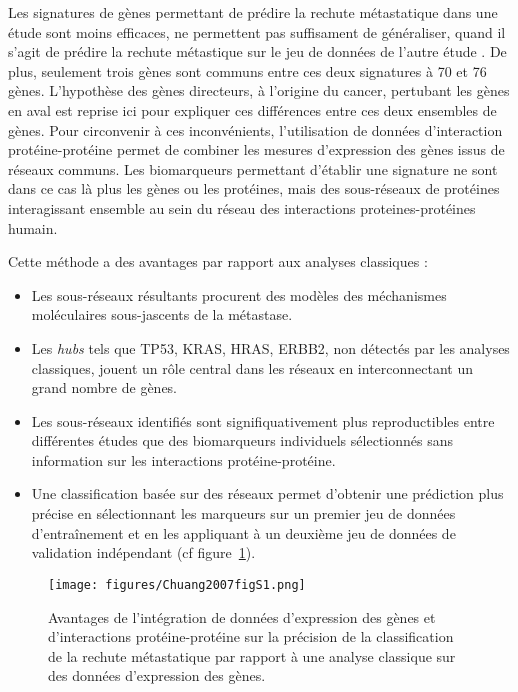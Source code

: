 			Les signatures de gènes permettant de prédire la rechute métastatique dans une étude sont moins efficaces, ne permettent pas suffisament de généraliser, quand il s'agit de prédire la rechute métastique sur le jeu de données de l'autre étude \citep{EinDor2006}.
			De plus, seulement trois gènes sont communs entre ces deux signatures à 70 et 76 gènes.
			L'hypothèse des gènes directeurs, à l'origine du cancer, pertubant les gènes en aval est reprise ici pour expliquer ces différences entre ces deux ensembles de gènes.
			Pour circonvenir à ces inconvénients, l'utilisation de données d'interaction protéine-protéine permet de combiner les mesures d'expression des gènes issus de réseaux communs.
			Les biomarqueurs permettant d'établir une signature ne sont dans ce cas là plus les gènes ou les protéines, mais des sous-réseaux de protéines interagissant ensemble au sein du réseau des interactions proteines-protéines humain.

			Cette méthode a des avantages par rapport aux analyses classiques :
			\begin{itemize}
				\item Les sous-réseaux résultants procurent des modèles des méchanismes moléculaires sous-jascents de la métastase.
				\item Les \emph{hubs} tels que \acs{TP53}, \acs{KRAS}, \acs{HRAS}, \acs{ERBB2}, non détectés par les analyses classiques, jouent un rôle central dans les réseaux en interconnectant un grand nombre de gènes.
				\item Les sous-réseaux identifiés sont signifiquativement plus reproductibles entre différentes études que des biomarqueurs individuels sélectionnés sans information sur les interactions protéine-protéine.
				\item Une classification basée sur des réseaux permet d'obtenir une prédiction plus précise en sélectionnant les marqueurs sur un premier jeu de données d'entraînement et en les appliquant à un deuxième jeu de données de validation indépendant (cf figure~\ref{fig:Chuang2007figS1}).
			\end{itemize}

			\begin{figure}
				\centering
				\texttt{[image: figures/Chuang2007figS1.png]}
				\caption{Avantages de l'intégration de données d'expression des gènes et d'interactions protéine-protéine sur la précision de la classification de la rechute métastatique par rapport à une analyse classique sur des données d'expression des gènes\citep{Chuang2007}.}
				\label{fig:Chuang2007figS1}
			\end{figure}

